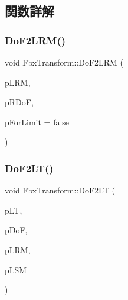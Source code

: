 \subsection{関数詳解}
\mbox{\label{class_fbx_transform_a847bede94ccc4f6376c25e9b891472e4}} 
\subsubsection{\texorpdfstring{Do\+F2\+L\+R\+M()}{DoF2LRM()}}
{\footnotesize\ttfamily void Fbx\+Transform\+::\+Do\+F2\+L\+RM (\begin{DoxyParamCaption}\item[{\hyperlink{class_fbx_a_matrix}{Fbx\+A\+Matrix} \&}]{p\+L\+RM,  }\item[{const \hyperlink{class_fbx_vector4}{Fbx\+Vector4} \&}]{p\+R\+DoF,  }\item[{bool}]{p\+For\+Limit = {\ttfamily false} }\end{DoxyParamCaption})}

\mbox{\label{class_fbx_transform_a37e9fe96d732d9231d8512529db452b0}} 
\subsubsection{\texorpdfstring{Do\+F2\+L\+T()}{DoF2LT()}}
{\footnotesize\ttfamily void Fbx\+Transform\+::\+Do\+F2\+LT (\begin{DoxyParamCaption}\item[{\hyperlink{class_fbx_vector4}{Fbx\+Vector4} \&}]{p\+LT,  }\item[{const \hyperlink{class_fbx_vector4}{Fbx\+Vector4} \&}]{p\+DoF,  }\item[{const \hyperlink{class_fbx_a_matrix}{Fbx\+A\+Matrix} \&}]{p\+L\+RM,  }\item[{const \hyperlink{class_fbx_a_matrix}{Fbx\+A\+Matrix} \&}]{p\+L\+SM }\end{DoxyParamCaption})}

\mbox{\label{class_fbx_transform_ad29a1e87720838947b5444937c9326ae}} 
